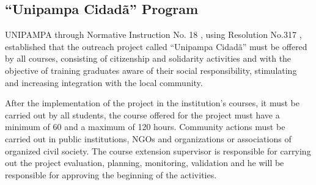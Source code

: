 \subsection{``Unipampa Cidadã'' Program}\label{sec:3.2.2}


\ac{UNIPAMPA} through Normative Instruction No. 18 \cite{unipampacidada}, using Resolution No.317 \cite{CONSUNI-Unipampa:2021}, established that the outreach project called ``Unipampa Cidadã'' must be offered by all courses, consisting of citizenship and solidarity activities and with the objective of training graduates aware of their social responsibility, stimulating and increasing integration with the local community.


After the implementation of the project in the institution's courses, it must be carried out by all students, the course offered for the project must have a minimum of 60 and a maximum of 120 hours.
Community actions must be carried out in public institutions, \acp{NGO} and organizations or associations of organized civil society. 
The course extension supervisor is responsible for carrying out the project evaluation, planning, monitoring, validation and he will be responsible for approving the beginning of the activities.

